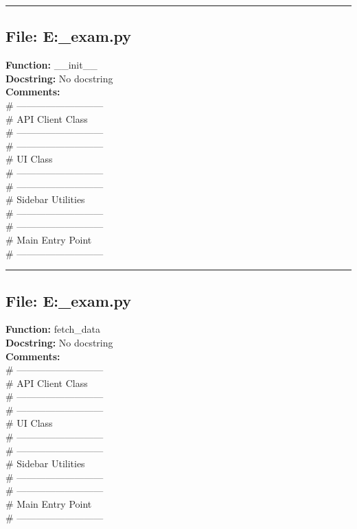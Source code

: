 {\hrule

\subsection*{File: E:\project\capstone\frontend\faculty\mst_exam.py}
\textbf{Function:} __init__\\
\textbf{Docstring:} No docstring\\
\textbf{Comments:}\\
# ---------------------------\\
# API Client Class\\
# ---------------------------\\
# ---------------------------\\
# UI Class\\
# ---------------------------\\
# ---------------------------\\
# Sidebar Utilities\\
# ---------------------------\\
# ---------------------------\\
# Main Entry Point\\
# ---------------------------\\

\hrule

\subsection*{File: E:\project\capstone\frontend\faculty\mst_exam.py}
\textbf{Function:} fetch_data\\
\textbf{Docstring:} No docstring\\
\textbf{Comments:}\\
# ---------------------------\\
# API Client Class\\
# ---------------------------\\
# ---------------------------\\
# UI Class\\
# ---------------------------\\
# ---------------------------\\
# Sidebar Utilities\\
# ---------------------------\\
# ---------------------------\\
# Main Entry Point\\
# ---------------------------\\

}
